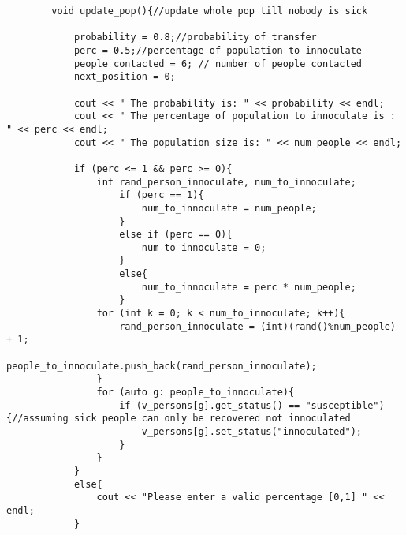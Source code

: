 \documentclass[paper=a4, fontsize=11pt]{scrartcl}
\begin{document}
\begin{lstlisting}
        void update_pop(){//update whole pop till nobody is sick
             
            probability = 0.8;//probability of transfer
            perc = 0.5;//percentage of population to innoculate
            people_contacted = 6; // number of people contacted
            next_position = 0;

            cout << " The probability is: " << probability << endl;
            cout << " The percentage of population to innoculate is : " << perc << endl;
            cout << " The population size is: " << num_people << endl;

            if (perc <= 1 && perc >= 0){
                int rand_person_innoculate, num_to_innoculate;
                    if (perc == 1){
                        num_to_innoculate = num_people;
                    }
                    else if (perc == 0){
                        num_to_innoculate = 0;
                    }
                    else{
                        num_to_innoculate = perc * num_people;
                    }
                for (int k = 0; k < num_to_innoculate; k++){
                    rand_person_innoculate = (int)(rand()%num_people) + 1;
                    people_to_innoculate.push_back(rand_person_innoculate);
                }
                for (auto g: people_to_innoculate){
                    if (v_persons[g].get_status() == "susceptible"){//assuming sick people can only be recovered not innoculated
                        v_persons[g].set_status("innoculated");
                    }
                }
            }
            else{
                cout << "Please enter a valid percentage [0,1] " << endl;
            }


\end{lstlisting}
\end{document}
